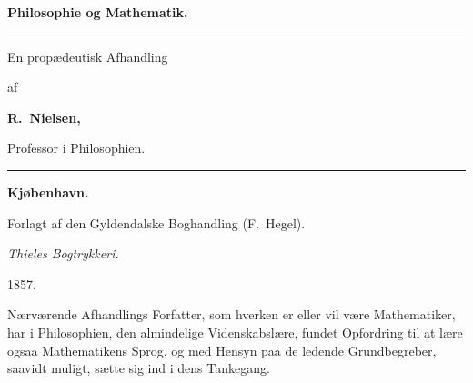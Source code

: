 \documentclass[12pt]{book}
\newcommand{\opage}[1]{\marginnote{\footnotesize\textit{[#1]}}}
\begin{document}
\begin{titlepage}
\centering
\vspace*{2cm}
{\Huge\bfseries Philosophie og Mathematik.\par}
\vspace{1.2cm}
\rule{4cm}{0.4pt}\par
\vspace{1.2cm}
{\LARGE En propædeutisk Afhandling\par}
\vspace{0.5cm}
{\large af\par}
\vspace{0.8cm}
{\LARGE\bfseries R.\ Nielsen,\par}
\vspace{0.2cm}
{\normalsize Professor i Philosophien.\par}
\vspace{2.4cm}
\rule{4cm}{0.4pt}\par
\vspace{1.6cm}
{\large\bfseries Kjøbenhavn.\par}
\vspace{0.4cm}
{\normalsize Forlagt af den Gyldendalske Boghandling (F.\ Hegel).\par}
\vspace{0.3cm}
{\small\emph{Thieles Bogtrykkeri.}\par}
\vspace{0.6cm}
{\large 1857.\par}
\end{titlepage}

\frontmatter
\tableofcontents
\mainmatter


\opage{3} \noindent Nærværende Afhandlings Forfatter, som hverken er eller vil være
Mathematiker, har i Philosophien, den almindelige Videnskabslære, fundet
Opfordring til at lære ogsaa Mathematikens Sprog, og med Hensyn paa de ledende
Grundbegreber, saavidt muligt, sætte sig ind i dens Tankegang.

\opage{4} %
\end{document}
